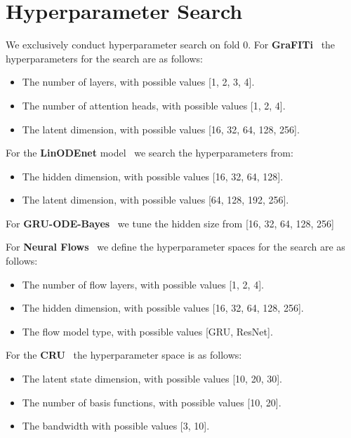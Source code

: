 \section{Hyperparameter Search}\label{app:hype}
\normalsize
We exclusively conduct hyperparameter search on fold 0. 
For \textbf{GraFITi}~\citep{Yalavarthi2024.GraFITi} the hyperparameters for the search are as follows:
\begin{itemize}
    \item The number of layers, with possible values [1, 2, 3, 4].
    \item The number of attention heads, with possible values [1, 2, 4].
    \item The latent dimension, with possible values [16, 32, 64, 128, 256].
\end{itemize}

For the \textbf{LinODEnet} model~\citep{Scholz2022.Latenta} we search the hyperparameters from:
\begin{itemize}
    \item The hidden dimension, with possible values [16, 32, 64, 128].
    \item The latent dimension, with possible values [64, 128, 192, 256].
\end{itemize}

For \textbf{GRU-ODE-Bayes}~\citep{DeBrouwer2019.GRUODEBayesd} we tune the hidden size from [16, 32, 64, 128, 256]

For \textbf{Neural Flows}~\citep{Bilos2021.Neurald} we define the hyperparameter spaces for the search are as follows:
\begin{itemize}
    \item The number of flow layers, with possible values [1, 2, 4].
    \item The hidden dimension, with possible values [16, 32, 64, 128, 256].
    \item The flow model type, with possible values [GRU, ResNet].
\end{itemize}

For the \textbf{CRU}~\citep{Schirmer2022.Modelingb} the hyperparameter space is as follows:
\begin{itemize}
    \item The latent state dimension, with possible values [10, 20, 30].
    \item The number of basis functions, with possible values [10, 20].
    \item The bandwidth with possible values [3, 10].
\end{itemize}
